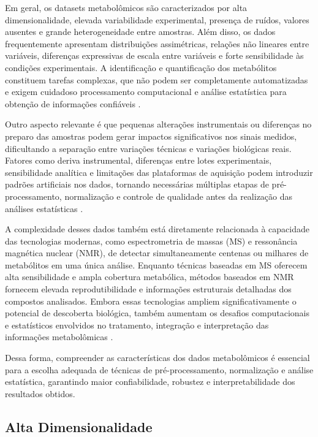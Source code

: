 Em geral, os datasets metabolômicos são caracterizados por alta dimensionalidade, elevada variabilidade experimental, presença de ruídos, valores ausentes e grande heterogeneidade entre amostras. Além disso, os dados frequentemente apresentam distribuições assimétricas, relações não lineares entre variáveis, diferenças expressivas de escala entre variáveis e forte sensibilidade às condições experimentais. A identificação e quantificação dos metabólitos constituem tarefas complexas, que não podem ser completamente automatizadas e exigem cuidadoso processamento computacional e análise estatística para obtenção de informações confiáveis \cite{shahjaman2021rmisbeta}.

Outro aspecto relevante é que pequenas alterações instrumentais ou diferenças no preparo das amostras podem gerar impactos significativos nos sinais medidos, dificultando a separação entre variações técnicas e variações biológicas reais. Fatores como deriva instrumental, diferenças entre lotes experimentais, sensibilidade analítica e limitações das plataformas de aquisição podem introduzir padrões artificiais nos dados, tornando necessárias múltiplas etapas de pré-processamento, normalização e controle de qualidade antes da realização das análises estatísticas \cite{shahjaman2021rmisbeta}.

A complexidade desses dados também está diretamente relacionada à capacidade das tecnologias modernas, como espectrometria de massas (MS) e ressonância magnética nuclear (NMR), de detectar simultaneamente centenas ou milhares de metabólitos em uma única análise. Enquanto técnicas baseadas em MS oferecem alta sensibilidade e ampla cobertura metabólica, métodos baseados em NMR fornecem elevada reprodutibilidade e informações estruturais detalhadas dos compostos analisados. Embora essas tecnologias ampliem significativamente o potencial de descoberta biológica, também aumentam os desafios computacionais e estatísticos envolvidos no tratamento, integração e interpretação das informações metabolômicas \cite{NMR}.

Dessa forma, compreender as características dos dados metabolômicos é essencial para a escolha adequada de técnicas de pré-processamento, normalização e análise estatística, garantindo maior confiabilidade, robustez e interpretabilidade dos resultados obtidos.

\subsection{Alta Dimensionalidade}

